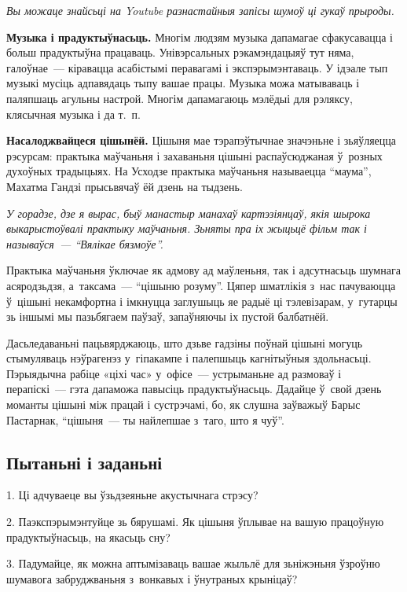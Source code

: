 \emph{Вы можаце знайсьці на Youtube разнастайныя запісы шумоў ці гукаў прыроды.}

\textbf{Музыка і прадуктыўнасьць.} Многім людзям музыка дапамагае сфакусавацца і больш прадуктыўна працаваць. Унівэрсальных рэкамэндацыяў тут няма, галоўнае~--- кіравацца асабістымі перавагамі і экспэрымэнтаваць. У ідэале тып музыкі мусіць адпавядаць тыпу вашае працы. Музыка можа матываваць і паляпшаць агульны настрой. Многім дапамагаюць мэлёдыі для рэляксу, клясычная музыка і да т.~п.

\textbf{Насалоджвайцеся цішынёй.} Цішыня мае тэрапэўтычнае значэньне і зьяўляецца рэсурсам: практыка маўчаньня і захаваньня цішыні распаўсюджаная ў~розных духоўных традыцыях. На Усходзе практыка маўчаньня называецца ``маума'', Махатма Гандзі прысьвячаў ёй дзень на тыдзень.

\emph{У горадзе, дзе я вырас, быў манастыр манахаў картэзіянцаў, якія шырока выкарыстоўвалі практыку маўчаньня. Зьняты пра іх жыцьцё фільм так і называўся~--- ``Вялікае бязмоўе''.}

Практыка маўчаньня ўключае як адмову ад маўленьня, так і адсутнасьць шумнага асяродзьдзя, а~таксама~--- ``цішыню розуму''. Цяпер шматлікія з~нас пачуваюцца ў~цішыні некамфортна і імкнуцца заглушыць яе радыё ці тэлевізарам, у~гутарцы зь іншымі мы пазьбягаем паўзаў, запаўняючы іх пустой балбатнёй.


Дасьледаваньні пацьвярджаюць, што дзьве гадзіны поўнай цішыні могуць стымуляваць нэўрагенэз у~гіпакампе і палепшыць кагнітыўныя здольнасьці. Пэрыядычна рабіце «ціхі час» у~офісе~--- устрыманьне ад размоваў і перапіскі~--- гэта дапаможа павысіць прадуктыўнасьць. Дадайце ў~свой дзень моманты цішыні між працай і сустрэчамі, бо, як слушна заўважыў Барыс Пастарнак, ``цішыня~--- ты найлепшае з~таго, што я чуў''.

\subsection*{Пытаньні і заданьні}

1. Ці адчуваеце вы ўзьдзеяньне акустычнага стрэсу?

2. Паэкспэрымэнтуйце зь бярушамі. Як цішыня ўплывае на вашую працоўную прадуктыўнасьць, на якасьць сну?

3. Падумайце, як можна аптымізаваць вашае жыльлё для зьніжэньня ўзроўню шумавога забруджваньня з~вонкавых і ўнутраных крыніцаў?


